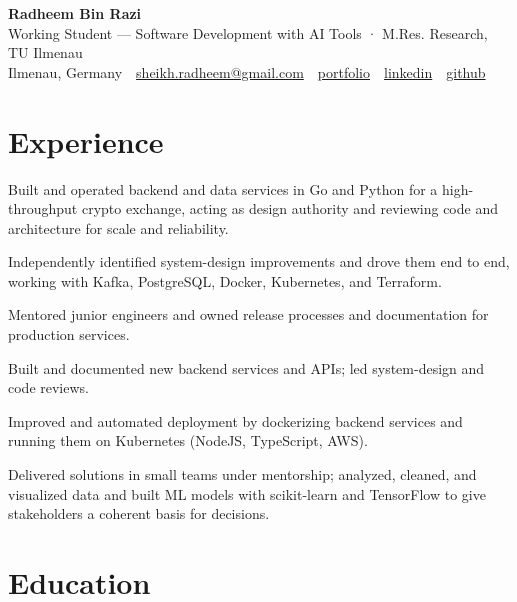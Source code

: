 \documentclass[11pt,a4paper]{resume}
\makeatletter
\newcommand{\Portfolio}{https://radheem.github.io/my-cv}
\newcommand{\PortfolioText}{portfolio}
\newcommand{\GitHub}{https://github.com/radheem}
\newcommand{\LinkedIn}{https://www.linkedin.com/in/radheem-razi}
\newcommand{\Email}{sheikh.radheem@gmail.com}
\makeatother
\begin{document}
\begin{center}
  {\huge\bfseries Radheem Bin Razi}\\[3pt]
  {\large Working Student — Software Development with AI Tools · M.Res. Research, TU Ilmenau}\\[6pt]
  \small
  Ilmenau, Germany \,\textbar\,
  \href{mailto:\Email}{\Email} \,\textbar\,
  \href{\Portfolio}{\PortfolioText} \,\textbar\,
  \href{\LinkedIn}{linkedin} \,\textbar\,
  \href{\GitHub}{github}
\end{center}
\vspace{2pt}

\section{Experience}

\bullets
  \item Built and operated backend and data services in Go and Python for a high-throughput crypto exchange, acting as design authority and reviewing code and architecture for scale and reliability.
  \item Independently identified system-design improvements and drove them end to end, working with Kafka, PostgreSQL, Docker, Kubernetes, and Terraform.
  \item Mentored junior engineers and owned release processes and documentation for production services.
\bulletsend
\vspace{3pt}
\bullets
  \item Built and documented new backend services and APIs; led system-design and code reviews.
  \item Improved and automated deployment by dockerizing backend services and running them on Kubernetes (NodeJS, TypeScript, AWS).
\bulletsend
\vspace{3pt}
\bullets
  \item Delivered solutions in small teams under mentorship; analyzed, cleaned, and visualized data and built ML models with scikit-learn and TensorFlow to give stakeholders a coherent basis for decisions.
\bulletsend
\vspace{3pt}

\section{Education}
\end{document}

